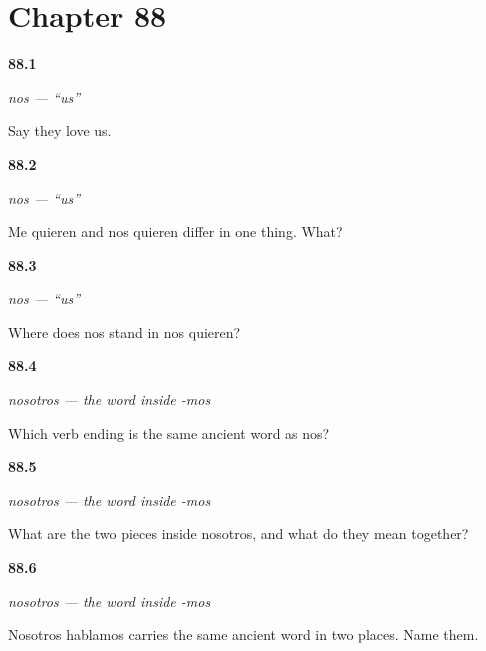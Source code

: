 \section*{Chapter 88}

\noindent\begin{minipage}[t]{\linewidth}
\raggedright
\hypertarget{review-ES-C45-nos-say}{\textbf{88.1}} \emph{nos — \textquotedblleft{}us\textquotedblright{}}\par
\small Say they love us.
\end{minipage}\par\medskip

\noindent\begin{minipage}[t]{\linewidth}
\raggedright
\hypertarget{review-ES-C45-nos-count}{\textbf{88.2}} \emph{nos — \textquotedblleft{}us\textquotedblright{}}\par
\small Me quieren and nos quieren differ in one thing. What?
\end{minipage}\par\medskip

\noindent\begin{minipage}[t]{\linewidth}
\raggedright
\hypertarget{review-ES-C45-nos-slot}{\textbf{88.3}} \emph{nos — \textquotedblleft{}us\textquotedblright{}}\par
\small Where does nos stand in nos quieren?
\end{minipage}\par\medskip

\noindent\begin{minipage}[t]{\linewidth}
\raggedright
\hypertarget{review-ES-C45-nosotros-ending}{\textbf{88.4}} \emph{nosotros — the word inside -mos}\par
\small Which verb ending is the same ancient word as nos?
\end{minipage}\par\medskip

\noindent\begin{minipage}[t]{\linewidth}
\raggedright
\hypertarget{review-ES-C45-nosotros-word}{\textbf{88.5}} \emph{nosotros — the word inside -mos}\par
\small What are the two pieces inside nosotros, and what do they mean together?
\end{minipage}\par\medskip

\noindent\begin{minipage}[t]{\linewidth}
\raggedright
\hypertarget{review-ES-C45-nosotros-twice}{\textbf{88.6}} \emph{nosotros — the word inside -mos}\par
\small Nosotros hablamos carries the same ancient word in two places. Name them.
\end{minipage}\par\medskip

